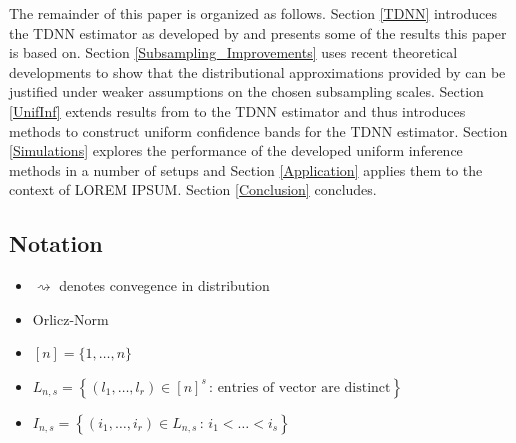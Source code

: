 \documentclass[letterpaper,10pt]{article}
\numberwithin{equation}{section}
\numberwithin{theorem}{section}
\numberwithin{remark}{section}
\numberwithin{example}{section}
\theoremstyle{definition}
\newcommand{\1}{\mathbb{1}}
\begin{document}
The remainder of this paper is organized as follows.
Section \ref{TDNN} introduces the TDNN estimator as developed by \citet{demirkaya_optimal_2024} and presents some of the results this paper is based on.
Section \ref{Subsampling_Improvements} uses recent theoretical developments to show that the distributional approximations provided by \citet{demirkaya_optimal_2024} can be justified under weaker assumptions on the chosen subsampling scales.
Section \ref{UnifInf} extends results from \citet{ritzwoller_uniform_2024} to the TDNN estimator and thus introduces methods to construct uniform confidence bands for the TDNN estimator.
Section \ref{Simulations} explores the performance of the developed uniform inference methods in a number of setups and Section \ref{Application} applies them to the context of {\color{red} LOREM IPSUM}.
Section \ref{Conclusion} concludes.

\subsection{Notation}
\begin{itemize}
	\item $\rightsquigarrow$ denotes convegence in distribution
	\item Orlicz-Norm
	\item $[n] = \{1, \dotsc, n\}$
	\item $L_{n,s} = \left\{\left(l_1, \dotsc, l_r\right) \in [n]^{s} \, : \, \text{entries of vector are distinct} \right\}$
	\item $I_{n,s} = \left\{\left(i_1, \dotsc, i_r\right) \in L_{n,s} \, : \, i_1 < \dotsc < i_s \right\}$
\end{itemize}

\newpage
\end{document}
